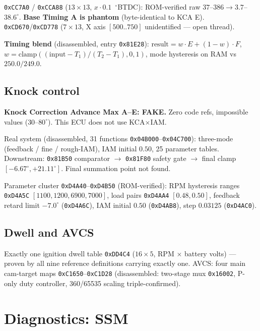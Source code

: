 \documentclass[11pt,a4paper]{book}
\begin{document}
\texttt{0xCC7A0} / \texttt{0xCCA88} ($13\times13$, $x \cdot 0.1$~$^\circ$BTDC):
ROM-verified raw $37$--$386 \rightarrow 3.7$--$38.6^\circ$.
\textbf{Base Timing A is phantom} (byte-identical to KCA E).
\texttt{0xCD670}/\texttt{0xCD778} ($7\times13$, X axis $[500..750]$
unidentified --- open thread).

\textbf{Timing blend} (disassembled, entry \texttt{0x81E28}):
$\mathrm{result} = w \cdot E + (1-w) \cdot F$,
$w = \mathrm{clamp}((\mathrm{input}-T_1)/(T_2-T_1), 0, 1)$,
mode hysteresis on RAM vs $250.0/249.0$.

\section{Knock control}

\textbf{Knock Correction Advance Max A--E: FAKE.} Zero code refs, impossible
values ($30$--$80^\circ$). This ECU does not use KCA$\times$IAM.

Real system (disassembled, 31 functions \texttt{0x04B000}--\texttt{0x04C700}):
three-mode (feedback / fine / rough-IAM), IAM initial $0.50$, 25 parameter
tables. Downstream: \texttt{0x81B50} comparator $\rightarrow$ \texttt{0x81F80}
safety gate $\rightarrow$ final clamp $[-6.67^\circ, +21.11^\circ]$.
Final summation point not found.

Parameter cluster \texttt{0xD4A40}--\texttt{0xD4B50} (ROM-verified):
RPM hysteresis ranges \texttt{0xD4A5C} $[1100, 1200, 6900, 7000]$,
load pairs \texttt{0xD4AA4} $[0.48, 0.50]$, feedback retard limit
$-7.0^\circ$ (\texttt{0xD4A6C}), IAM initial $0.50$ (\texttt{0xD4AB8}),
step $0.03125$ (\texttt{0xD4AC0}).

\section{Dwell and AVCS}

Exactly one ignition dwell table \texttt{0xDD4C4} ($16\times5$,
RPM $\times$ battery volts) --- proven by all nine reference definitions
carrying exactly one. AVCS: four main cam-target maps
\texttt{0xC1650}--\texttt{0xC1D28} (disassembled: two-stage mux
\texttt{0x16002}, P-only duty controller, 360/65535 scaling
triple-confirmed).

\chapter{Diagnostics: SSM}
\end{document}
